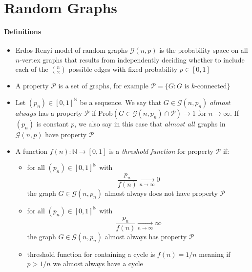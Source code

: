 \section{Random Graphs}
\paragraph{Definitions}
\begin{itemize}
    \item Erdos-Renyi model of random graphs $\mathcal{G}(n,p)$ is the 
    probability space on all $n$-vertex graphs that results from 
    independently deciding whether to include each of the $\binom{n}{2}$
    possible edges with fixed probability $p \in [0,1]$    

    \item A property $\mathcal{P}$ is a set of graphs, for example 
    $\mathcal{P} = \{G: G \text{ is } k\text{-connected}\}$

    \item Let $(p_n) \in [0,1]^{\mathbb{N}}$ be a sequence.
    We say that $G \in \mathcal{G}(n,p_n)$ $almost$ $always$ has a property
    $\mathcal{P}$ if Prob$(G \in \mathcal{G}(n,p_n) \cap \mathcal{P}) \to 1$
    for $n \to \infty$. If $(p_n)$ is constant $p$, we also say in this case
    that $almost$ $all$ graphs in $\mathcal{G}(n,p)$ have property
    $\mathcal{P}$

    \item A function $f(n): \mathbb{N} \to [0,1]$ is  a 
    \textit{threshold function} for property $\mathcal{P}$ if:
        \begin{itemize}
            \item for all $(p_n) \in [0,1]^{\mathbb{N}}$ with 
            $$\frac{p_n}{f(n)} \underset{n\to\infty}{\rightarrow} 0$$ the graph 
            $G \in \mathcal{G}(n,p_n)$ almost always does not have property 
            $\mathcal{P}$

            \item for all $(p_n) \in [0,1]^{\mathbb{N}}$ with 
            $$\frac{p_n}{f(n)} \underset{n\to\infty}{\rightarrow} \infty$$ the graph 
            $G \in \mathcal{G}(n,p_n)$ almost always has property 
            $\mathcal{P}$

            \item threshold function for containing a cycle is $f(n) = 1/n$
            meaning if $p > 1/n$ we almost always have a cycle

        \end{itemize}
\end{itemize}

